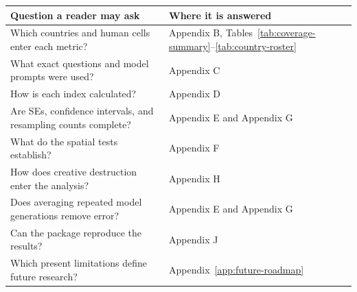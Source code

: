 \begin{table}[!htbp]
\centering
\small
\begin{tabular}{ll}
\toprule
\rowcolor{tablehead}
Question a reader may ask & Where it is answered \\
\midrule
Which countries and human cells enter each metric? & Appendix B, Tables~\ref{tab:coverage-summary}--\ref{tab:country-roster} \\
What exact questions and model prompts were used? & Appendix C \\
How is each index calculated? & Appendix D \\
Are SEs, confidence intervals, and resampling counts complete? & Appendix E and Appendix G \\
What do the spatial tests establish? & Appendix F \\
How does creative destruction enter the analysis? & Appendix H \\
Does averaging repeated model generations remove error? & Appendix E and Appendix G \\
Can the package reproduce the results? & Appendix J \\
Which present limitations define future research? & Appendix~\ref{app:future-roadmap} \\
\bottomrule
\end{tabular}
\end{table}
\FloatBarrier
